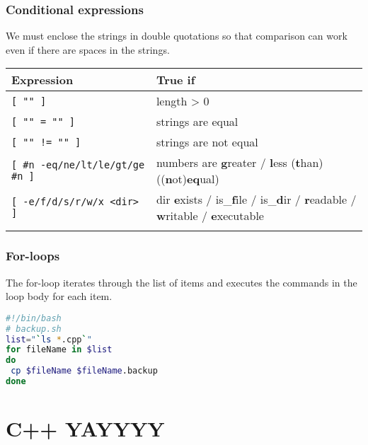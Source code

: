 \documentclass{article}
\begin{document}
\subsubsection{Conditional expressions}
We must enclose the strings in double quotations so that comparison can work even if there are spaces in the strings.
\begin{table}[H]
      \begin{tabular}{ll}
            \textbf{Expression}                      & \textbf{True if}                                                                                       \\ \hline
            \lstinline|[ "" ]|                       & length > 0                                                                                             \\ \arrayrulecolor{lightgray}\hline
            \lstinline|[ "" = "" ]|                  & strings are equal                                                                                      \\ \arrayrulecolor{lightgray}\hline
            \lstinline|[ "" != "" ]|                 & strings are not equal                                                                                  \\ \arrayrulecolor{lightgray}\hline
            \lstinline|[ #n -eq/ne/lt/le/gt/ge #n ]| & numbers are {\bf g}reater / {\bf l}ess ({\bf t}han) (({\bf n}ot){\bf eq}ual)                           \\ \arrayrulecolor{lightgray}\hline
            \lstinline|[ -e/f/d/s/r/w/x <dir> ]|     & dir {\bf e}xists / is\_{\bf f}ile / is\_{\bf d}ir / {\bf r}eadable / {\bf w}ritable / {\bf e}xecutable \\ \arrayrulecolor{lightgray}\hline
      \end{tabular}
\end{table}

\subsubsection{For-loops}
The for-loop iterates through the list of items and executes the commands in the loop body for each item.

\begin{lstlisting}[language=bash]
#!/bin/bash
# backup.sh
list="`ls *.cpp`"
for fileName in $list
do
 cp $fileName $fileName.backup
done \end{lstlisting}

\section{C++ YAYYYY}
\end{document}
